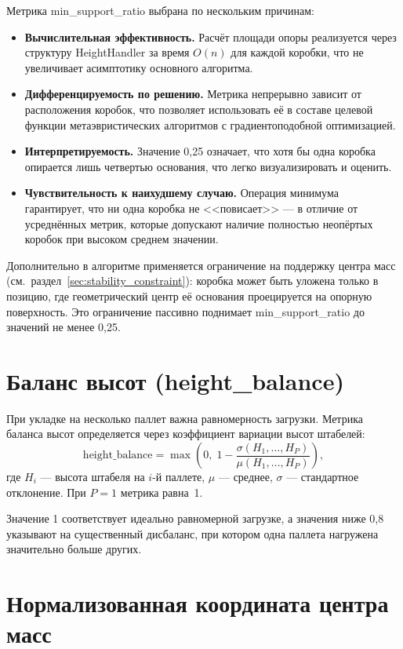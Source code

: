 Метрика min\_support\_ratio выбрана по нескольким причинам:
\begin{itemize}
  \item \textbf{Вычислительная эффективность.} Расчёт площади опоры реализуется через структуру HeightHandler за время $O(n)$ для каждой коробки, что не увеличивает асимптотику основного алгоритма.
  \item \textbf{Дифференцируемость по решению.} Метрика непрерывно зависит от расположения коробок, что позволяет использовать её в составе целевой функции метаэвристических алгоритмов с градиентоподобной оптимизацией.
  \item \textbf{Интерпретируемость.} Значение 0,25 означает, что хотя бы одна коробка опирается лишь четвертью основания, что легко визуализировать и оценить.
  \item \textbf{Чувствительность к наихудшему случаю.} Операция минимума гарантирует, что ни одна коробка не <<повисает>> --- в отличие от усреднённых метрик, которые допускают наличие полностью неопёртых коробок при высоком среднем значении.
\end{itemize}

Дополнительно в алгоритме применяется ограничение на поддержку центра масс (см.~раздел~\ref{sec:stability_constraint}): коробка может быть уложена только в позицию, где геометрический центр её основания проецируется на опорную поверхность. Это ограничение пассивно поднимает min\_support\_ratio до значений не менее 0,25.

\section{Баланс высот (height\_balance)}
\label{sec:metric_hb}

При укладке на несколько паллет важна равномерность загрузки. Метрика баланса высот определяется через коэффициент вариации высот штабелей:
\[
\text{height\_balance} = \max\!\left(0,\; 1 - \frac{\sigma(H_1, \ldots, H_P)}{\mu(H_1, \ldots, H_P)}\right),
\]
где $H_i$ --- высота штабеля на $i$-й паллете, $\mu$ --- среднее, $\sigma$ --- стандартное отклонение. При $P = 1$ метрика равна~1.

Значение 1 соответствует идеально равномерной загрузке, а значения ниже 0,8 указывают на существенный дисбаланс, при котором одна паллета нагружена значительно больше других.

\section{Нормализованная координата центра масс}
\label{sec:metric_com}

